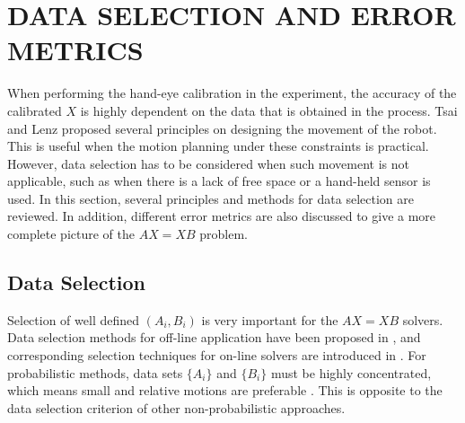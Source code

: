 \documentclass[twocolumn,10pt]{asme2ej}
\begin{document}
\section{DATA SELECTION AND ERROR METRICS}
When performing the hand-eye calibration in the experiment, the accuracy of the calibrated $X$ is highly dependent on the data that is obtained in the process. Tsai and Lenz \cite{tsai1989new} proposed several principles on designing the movement of the robot. This is useful when the motion planning under these constraints is practical.  However, data selection has to be considered when such movement is not applicable, such as when there is a lack of free space or a hand-held sensor is used. In this section, several principles and methods for data selection are reviewed. In addition, different error metrics are also discussed to give a more complete picture of the $AX=XB$ problem. 
 
\label{qianli-numerical}
\subsection{Data Selection}
Selection of well defined $(A_i,B_i)$ is very important for the $AX=XB$ solvers. Data selection methods for off-line application have been proposed in \cite{vogt2004vector,schmidt2008data,ackermanIROS2013}, and corresponding selection techniques for on-line solvers are introduced in \cite{shi2005approach,zhang2005adaptive}. For probabilistic methods, data sets $\{A_i\}$ and $\{B_i\}$ must be highly concentrated, which means small and relative motions are preferable \cite{ackermanGSI}. This is opposite to the data selection criterion of other non-probabilistic approaches.
\end{document}
